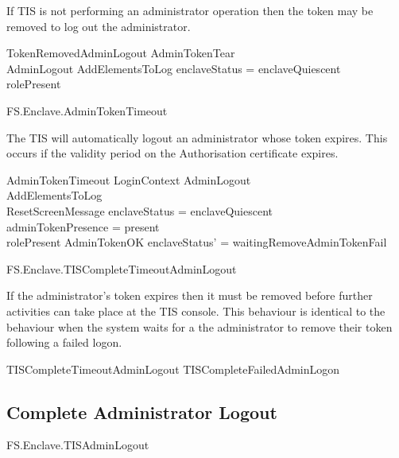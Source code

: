 If TIS is not performing an administrator operation then the
token may be removed to log out the administrator.

\begin{schema}{TokenRemovedAdminLogout}
        AdminTokenTear
\\      AdminLogout
\also
        AddElementsToLog
\where
        enclaveStatus = enclaveQuiescent 
\\      rolePresent \neq \Nil
\end{schema}

\begin{traceunit}{FS.Enclave.AdminTokenTimeout}
\end{traceunit}


The TIS will automatically logout an administrator whose token
expires. This occurs if the validity period on the Authorisation
certificate expires.

\begin{schema}{AdminTokenTimeout}
        LoginContext
\also
        AdminLogout
\\      AddElementsToLog
\\      ResetScreenMessage
\where
        enclaveStatus = enclaveQuiescent 
\\      adminTokenPresence = present
\\      rolePresent \neq \Nil
\also
        \lnot AdminTokenOK
\also
        enclaveStatus' = waitingRemoveAdminTokenFail
\end{schema}

\begin{traceunit}{FS.Enclave.TISCompleteTimeoutAdminLogout}
\end{traceunit}

If the administrator's token expires then it must be removed before
further activities can take place at the TIS console. This behaviour
is identical to the behaviour when the system waits for a the
administrator to remove their token following a failed logon.

\begin{zed}
TISCompleteTimeoutAdminLogout  TISCompleteFailedAdminLogon
\end{zed}

\subsection{Complete Administrator Logout}

\begin{traceunit}{FS.Enclave.TISAdminLogout}
\end{traceunit}

